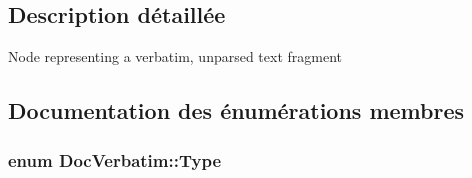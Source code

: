 \subsection{Description détaillée}
Node representing a verbatim, unparsed text fragment 

\subsection{Documentation des énumérations membres}
\hypertarget{class_doc_verbatim_ad8c770dcf2e62369b95f4e34fb11fa36}{}
\subsubsection[{Type}]{\setlength{\rightskip}{0pt plus 5cm}enum {\bf Doc\+Verbatim\+::\+Type}}\label{class_doc_verbatim_ad8c770dcf2e62369b95f4e34fb11fa36}
